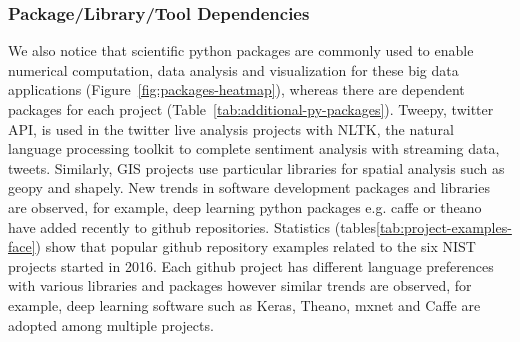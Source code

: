 \documentclass[9pt,twocolumn,twoside]{styles/osajnl}
\begin{document}
\subsubsection{Package/Library/Tool Dependencies}

We also notice that scientific python packages are commonly used to enable
numerical computation, data analysis and visualization for these big data
applications (Figure~\ref{fig:packages-heatmap}), whereas there are dependent
packages for each project (Table~\ref{tab:additional-py-packages}). Tweepy,
twitter API, is used in the twitter live analysis projects with NLTK, the
natural language processing toolkit to complete sentiment analysis with
streaming data, tweets. Similarly, GIS projects use particular libraries for
spatial analysis such as geopy and shapely. New trends in software development
packages and libraries are observed, for example, deep learning python packages
e.g. caffe or theano have added recently to github repositories. Statistics
(tables\ref{tab:project-examples-face}) show that popular github repository
examples related to the six NIST projects started in 2016. Each github project
has different language preferences with various libraries and packages however
similar trends are observed, for example, deep learning software such as Keras,
Theano, mxnet and Caffe are adopted among multiple projects.
\end{document}
